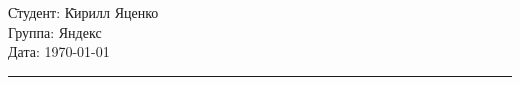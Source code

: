 \begin{tabbing}
  \hspace{11cm} \= Студент: \= Кирилл Яценко \\
    \> Группа: Яндекс \>  \\
    \> Дата: \> \today
  \end{tabbing}
  \hrule
  \vspace{1cm}
  
  